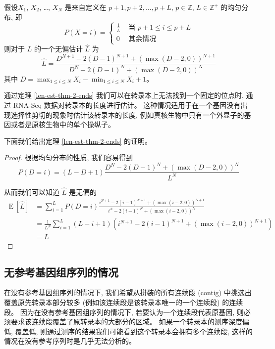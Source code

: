 \begin{thm}
\label{len-est-thm-2-ends}
假设$X_1$, $X_2$, \ldots, $X_N$ 是来自定义在 
${p+1, p+2, \ldots , p+L}$, $p \in \mathbb{Z}$, $L \in \mathbb{Z}^+$ 的均匀分布, 
即 
\[
P(X = i) =  \begin{cases}
\frac{1}{L} & \text{ 当 } p+1 \leq i \leq p+L \\
0 & \text{ 其余情况 }
\end{cases}
\]
则对于 $L$ 的一个无偏估计 $\hat{L}$ 为
\begin{equation}
\label{len-est-thm-2-ends-eq}
\hat{L} = \frac{ D^{N+1} - 2 (D-1)^{N+1} + (\max(D-2, 0))^{N+1} }{ D^{N} - 2 (D-1)^{N} + (\max(D-2, 0))^{N} }
\end{equation}
其中 $D = \max_{1 \leq i \leq N} X_i - \min_{1 \leq i \leq N} X_i +1$。 
\end{thm}

通过定理 \ref{len-est-thm-2-ends} 我们可以在转录本上无法找到一个固定的位点时, 
通过 RNA-Seq 数据对转录本的长度进行估计。 
这种情况适用于在一个基因没有出现选择性剪切的现象时估计该转录本的长度, 
例如真核生物中只有一个外显子的基因或者是原核生物中的单个操纵子。 

下面我们给出定理 \ref{len-est-thm-2-ends} 的证明。 

\begin{proof}
根据均匀分布的性质, 我们容易得到
\[
P(D=i) = (L-D +1) \frac{ D^N - 2 (D-1)^N  + (\max(D-2,0))^N}{ L^N }
\]

从而我们可以知道 $\hat{L}$ 是无偏的
\begin{align*}
\operatorname{E}[\hat{L}] &= \sum_{i=1}^L P(D=i) 
    \frac{i^{N+1}-2(i-1)^{N+1}+(\max(i-2,0))^{N+1}}{i^N-2(i-1)^N+(\max(i-2,0))^N} \\
&= \frac{1}{L^N} \sum_{i=1}^L (L-i+1)(i^{N+1}-2(i-1)^{N+1}+(\max(i-2,0))^{N+1}) \\
&= L
\end{align*}

\end{proof}

\subsection{无参考基因组序列的情况}
\nocite{ewens2005statistical} 

在没有参考基因组序列的情况下, 我们希望从拼装的所有连续段 (contig) 
中挑选出覆盖原先转录本部分较多 (例如该连续段是该转录本唯一的一个连续段) 的连续段。 
因为在没有参考基因组序列的情况下, 若要认为一个连续段代表原基因, 
则必须要求该连续段覆盖了原转录本的大部分的区域。 
如果一个转录本的测序深度偏低, 覆盖低, 
则通过测序的结果我们可能看到这个转录本会拥有多个连续段, 
这样的情况在没有参考序列时是几乎无法分析的。

